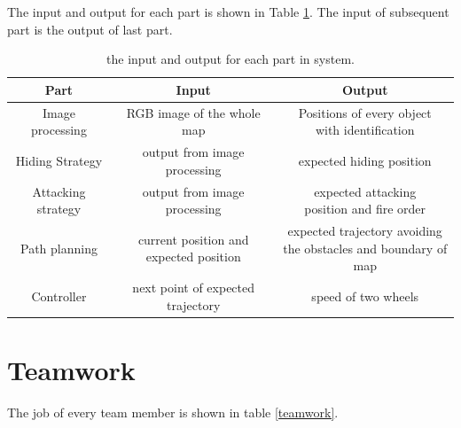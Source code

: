 The input and output for each part is shown in Table \ref{system_io}. The input of subsequent part is the output of last part.

\begin{table}[h]\footnotesize
\begin{tabular}{c|cc}
    \hline 
    Part&Input&Output\\
    \hline 
    Image processing&RGB image of the whole map&\makecell[c]{Positions of every object\\ with identification}\\
    \hline 
    Hiding Strategy&output from image processing&expected hiding position\\
    \hline 
    Attacking strategy&output from image processing&\makecell[c]{expected attacking\\ position and fire order}\\
    \hline 
    Path planning &\makecell[c]{current position and \\expected position}& \makecell[c]{expected trajectory avoiding \\the obstacles and boundary of map}\\
    \hline 
    Controller &next point of expected trajectory&speed of two wheels\\
    \hline 
\end{tabular}
\caption[the input and output for each part in system]{the input and output for each part in system.}\label{system_io}
\end{table}

\section{Teamwork}

The job of every team member is shown in table \ref{teamwork}.

